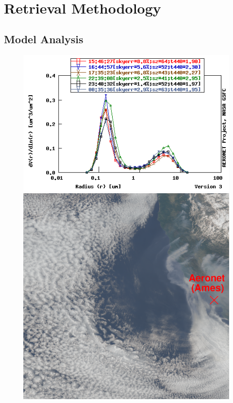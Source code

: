 \documentclass[12pt]{article}
\begin{document}
\section{Retrieval Methodology}

\subsection{Model Analysis}

\begin{figure}[h!]
    \centering
    \begin{center}
        \includegraphics[width=.55\paperwidth]{figs/20210818_aeronet_ames_sdist.png}
        \includegraphics[width=.55\paperwidth]{figs/20210818_aeronet_marked-rgb.png}
    \end{center}
    \caption{}
    \label{}
\end{figure}
\end{document}
